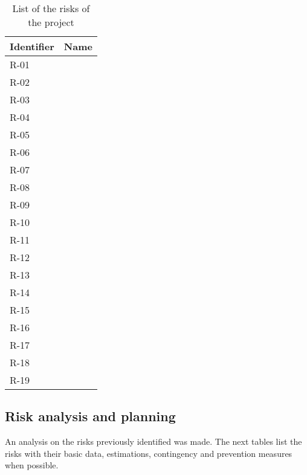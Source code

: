 \begin{table}[H]
	\begin{tabularx}{\textwidth}{|l|X|}
		\hline
		\rowcolor{gray!30}
		Identifier & Name \\ \hline
		R-01 & \Runo \\ \hline
		R-02 & \Rdos \\ \hline
		R-03 & \Rtres \\ \hline
		R-04 & \Rcuatro \\ \hline
		R-05 & \Rcinco \\ \hline
		R-06 & \Rseis \\ \hline
		R-07 & \Rsiete \\ \hline
		R-08 & \Rocho \\ \hline
		R-09 & \Rnueve \\ \hline
		R-10 & \Rdiez \\ \hline
		R-11 & \Ronce \\ \hline
		R-12 & \Rdoce \\ \hline
		R-13 & \Rtrece \\ \hline
		R-14 & \Rcatorce \\ \hline
		R-15 & \Rquince \\ \hline
		R-16 & \Rdieciseis \\ \hline
		R-17 & \Rdiecisiete \\ \hline
		R-18 & \Rdieciocho \\ \hline
		R-19 & \Rdiecinueve \\ \hline
	\end{tabularx}
	\caption{List of the risks of the project}
\end{table}

\subsection{Risk analysis and planning}
An analysis on the risks previously identified was made. The next tables list the risks with their basic data, estimations, contingency and prevention measures when possible.


